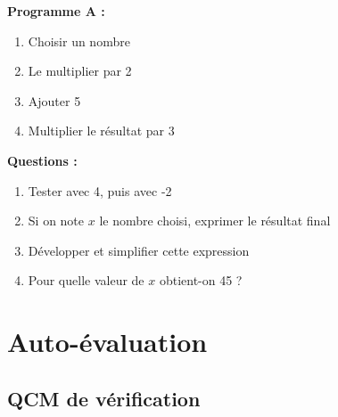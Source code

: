 \begin{activitybox}
	\textbf{Programme A :}
	\begin{enumerate}
		\item Choisir un nombre
		\item Le multiplier par 2
		\item Ajouter 5
		\item Multiplier le résultat par 3
	\end{enumerate}
	
	\textbf{Questions :}
	\begin{enumerate}[label=\alph*)]
		\item Tester avec 4, puis avec -2
		\item Si on note $x$ le nombre choisi, exprimer le résultat final
		\item Développer et simplifier cette expression
		\item Pour quelle valeur de $x$ obtient-on 45 ?
	\end{enumerate}
\end{activitybox}

\section{Auto-évaluation}

\subsection{QCM de vérification}

